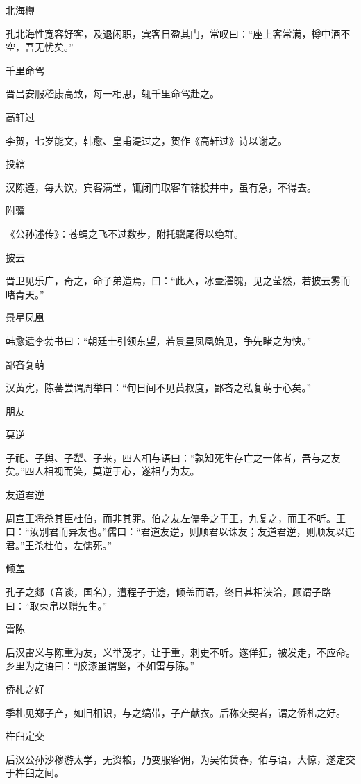 \documentclass[a4paper,12pt,UTF8,twoside]{ctexbook}
\begin{document}
    北海樽
    
    孔北海性宽容好客，及退闲职，宾客日盈其门，常叹曰：“座上客常满，樽中酒不空，吾无忧矣。”
    
    千里命驾
    
    晋吕安服嵇康高致，每一相思，辄千里命驾赴之。
    
    高轩过
    
    李贺，七岁能文，韩愈、皇甫湜过之，贺作《高轩过》诗以谢之。
    
    投辖
    
    汉陈遵，每大饮，宾客满堂，辄闭门取客车辖投井中，虽有急，不得去。
    
    附骥
    
    《公孙述传》：苍蝇之飞不过数步，附托骥尾得以绝群。
    
    披云
    
    晋卫见乐广，奇之，命子弟造焉，曰：“此人，冰壶濯魄，见之莹然，若披云雾而睹青天。”
    
    景星凤凰
    
    韩愈遗李勃书曰：“朝廷士引领东望，若景星凤凰始见，争先睹之为快。”
    
    鄙吝复萌
    
    汉黄宪，陈蕃尝谓周举曰：“旬日间不见黄叔度，鄙吝之私复萌于心矣。”
    
    朋友
    
    莫逆
    
    子祀、子舆、子犁、子来，四人相与语曰：“孰知死生存亡之一体者，吾与之友矣。”四人相视而笑，莫逆于心，遂相与为友。
    
    友道君逆
    
    周宣王将杀其臣杜伯，而非其罪。伯之友左儒争之于王，九复之，而王不听。王曰：“汝别君而异友也。”儒曰：“君道友逆，则顺君以诛友；友道君逆，则顺友以违君。”王杀杜伯，左儒死。”
    
    倾盖
    
    孔子之郯（音谈，国名），遭程子于途，倾盖而语，终日甚相浃洽，顾谓子路曰：“取束帛以赠先生。”
    
    雷陈
    
    后汉雷义与陈重为友，义举茂才，让于重，刺史不听。遂佯狂，被发走，不应命。乡里为之语曰：“胶漆虽谓坚，不如雷与陈。”
    
    侨札之好
    
    季札见郑子产，如旧相识，与之缟带，子产献衣。后称交契者，谓之侨札之好。
    
    杵臼定交
    
    后汉公孙沙穆游太学，无资粮，乃变服客佣，为吴佑赁舂，佑与语，大惊，遂定交于杵臼之间。
    
\end{document}

